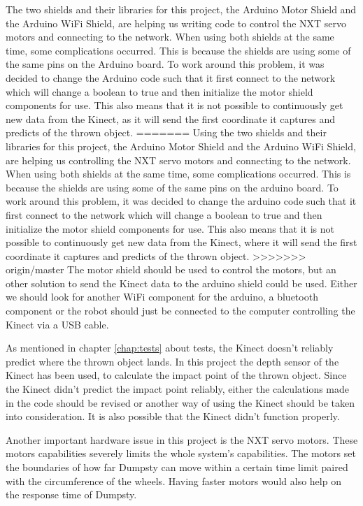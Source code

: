 The two shields and their libraries for this project, the Arduino Motor Shield and the Arduino WiFi Shield, are helping us writing code to control the NXT servo motors and connecting to the network. When using both shields at the same time, some complications occurred. This is because the shields are using some of the same pins on the Arduino board. To work around this problem, it was decided to change the Arduino code such that it first connect to the network which will change a boolean to true and then initialize the motor shield components for use. This also means that it is not possible to continuously get new data from the Kinect, as it will send the first coordinate it captures and predicts of the thrown object. \newline
=======
Using the two shields and their libraries for this project, the Arduino Motor Shield and the Arduino WiFi Shield, are helping us controlling the NXT servo motors and connecting to the network. When using both shields at the same time, some complications occurred. This is because the shields are using some of the same pins on the arduino board. To work around this problem, it was decided to change the arduino code such that it first connect to the network which will change a boolean to true and then initialize the motor shield components for use. This also means that it is not possible to continuously get new data from the Kinect, where it will send the first coordinate it captures and predicts of the thrown object. \newline
>>>>>>> origin/master
The motor shield should be used to control the motors, but an other solution to send the Kinect data to the arduino shield could be used. Either we should look for another WiFi component for the arduino, a bluetooth component or the robot should just be connected to the computer controlling the Kinect via a USB cable. 



As mentioned in chapter \ref{chap:tests} about tests, the Kinect doesn’t reliably predict where the thrown object lands. In this project the depth sensor of the Kinect has been used, to calculate the impact point of the thrown object. Since the Kinect didn’t predict the impact point reliably, either the calculations made in the code should be revised or another way of using the Kinect should be taken into consideration. It is also possible that the Kinect didn’t function properly. 


Another important hardware issue in this project is the NXT servo motors. These motors capabilities severely limits the whole system’s capabilities. The motors set the boundaries of how far Dumpsty can move within a certain time limit paired with the circumference of the wheels. Having faster motors would also help on the response time of Dumpsty.


